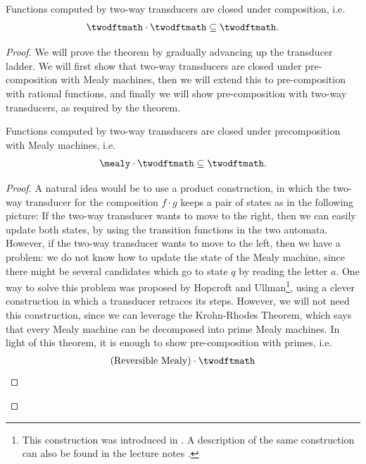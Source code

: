 \begin{theorem}\label{thm:composition-of-two-way-transducers}
    Functions computed by two-way transducers are closed under composition, i.e.~
\begin{align*}\twodftmath \cdot \twodftmath \subseteq \twodftmath.    
\end{align*}
\end{theorem}
\begin{proof}
    We will prove the theorem by gradually advancing up the transducer ladder. We will first show that two-way transducers are closed under pre-composition with Mealy machines, then we will extend this to pre-composition with rational functions, and finally we will show pre-composition with two-way transducers, as required by the theorem.

    \begin{lemma}\label{lem:2dfa-precomposition-with-mealy}
        Functions computed by two-way transducers are closed under precomposition with Mealy machines, i.e.
        \begin{align*}
        \mealy \cdot \twodftmath 
        \subseteq \twodftmath.   
        \end{align*}
    \end{lemma}
    \begin{proof} 
        A natural idea would be to use a product construction, in which the two-way transducer for the composition $f \cdot g$ keeps a pair of states as in the following picture:
        If the two-way transducer wants to move to the right, then we can easily update both states, by using the transition functions in the two automata. However, if the two-way transducer wants to move to the left, then we have a problem: we do not know how to update the state of the Mealy machine, since there might be several candidates which go to state $q$ by reading the letter $a$.  One way to solve this problem was proposed by  Hopcroft and Ullman\footnote{This construction was introduced in  
        \cite[Lemma 3]{hopcroftUllman1967}.
        A description of the same construction can also be found in the lecture notes
        \cite[Lemma 17.4]{bojanczyk_automata_2025}.
        }, using a clever construction in which a transducer retraces its steps.  However, we will not need this construction, since we can leverage the Krohn-Rhodes Theorem, which says that every Mealy machine can be decomposed into prime Mealy machines. In light of this theorem, it is enough to show pre-composition with primes, i.e.~
\begin{align*}\text{(Reversible Mealy)} \cdot \twodftmath 

\end{align*}
\end{proof}
\end{proof}
